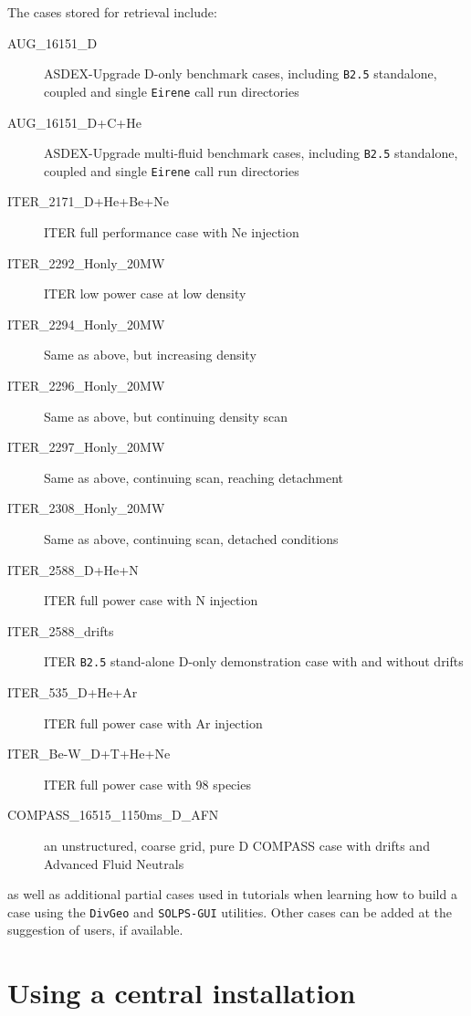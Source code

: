 \documentclass[a4paper,10pt]{report}
\begin{document}
The cases stored for retrieval include:
\begin{description}
  \item[AUG\_16151\_D] ASDEX-Upgrade D-only benchmark cases, including {\tt B2.5} standalone, coupled and single {\tt Eirene} call run directories
  \item[AUG\_16151\_D+C+He] ASDEX-Upgrade multi-fluid benchmark cases, including {\tt B2.5} standalone, coupled and single {\tt Eirene} call run directories
  \item[ITER\_2171\_D+He+Be+Ne] ITER full performance case with Ne injection
  \item[ITER\_2292\_Honly\_20MW] ITER low power case at low density
  \item[ITER\_2294\_Honly\_20MW] Same as above, but increasing density
  \item[ITER\_2296\_Honly\_20MW] Same as above, but continuing density scan
  \item[ITER\_2297\_Honly\_20MW] Same as above, continuing scan, reaching detachment
  \item[ITER\_2308\_Honly\_20MW] Same as above, continuing scan, detached conditions
  \item[ITER\_2588\_D+He+N] ITER full power case with N injection
  \item[ITER\_2588\_drifts] ITER {\tt B2.5} stand-alone D-only demonstration case with and without drifts
  \item[ITER\_535\_D+He+Ar] ITER full power case with Ar injection
  \item[ITER\_Be-W\_D+T+He+Ne] ITER full power case with 98 species
  \item[COMPASS\_16515\_1150ms\_D\_AFN] an unstructured, coarse grid, pure D COMPASS case with drifts and Advanced Fluid Neutrals
\end{description}
as well as additional partial cases used in tutorials when learning how to build a case using the {\tt DivGeo} and {\tt SOLPS-GUI} utilities.
Other cases can be added at the suggestion of users, if available.

\section{Using a central installation}
\label{Using a central installation}
\end{document}
